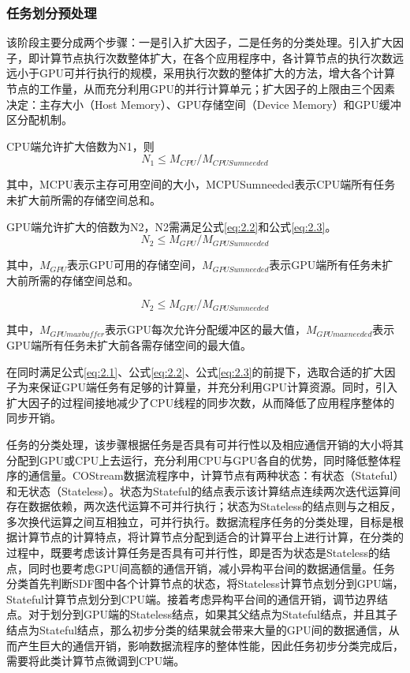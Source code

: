 \subsubsection{任务划分预处理}
该阶段主要分成两个步骤：一是引入扩大因子，二是任务的分类处理。引入扩大因子，即计算节点执行次数整体扩大，在各个应用程序中，各计算节点的执行次数远远小于GPU可并行执行的规模，采用执行次数的整体扩大的方法，增大各个计算节点的工作量，从而充分利用GPU的并行计算单元；扩大因子的上限由三个因素决定：主存大小（Host Memory）、GPU存储空间（Device Memory）和GPU缓冲区分配机制。

CPU端允许扩大倍数为N1，则
\begin{equation}
  N_1 \leq M_{CPU} / M_{CPUSumneeded} \label{eq:2.1}
\end{equation}

其中，MCPU表示主存可用空间的大小，MCPUSumneeded表示CPU端所有任务未扩大前所需的存储空间总和。

GPU端允许扩大的倍数为N2，N2需满足公式\ref{eq:2.2}和公式\ref{eq:2.3}。
\begin{equation}
  N_2 \leq M_{GPU} / M_{GPUSumneeded} \label{eq:2.2}
\end{equation}

其中，$M_{GPU}$表示GPU可用的存储空间，$M_{GPUSumneeded}$表示GPU端所有任务未扩大前所需的存储空间总和。

\begin{equation}
  N_2 \leq M_{GPU} / M_{GPUSumneeded} \label{eq:2.3}
\end{equation}

其中，$M_{GPUmaxbuffer}$表示GPU每次允许分配缓冲区的最大值，$M_{GPUmaxneeded}$表示GPU端所有任务未扩大前各需存储空间的最大值。

在同时满足公式\ref{eq:2.1}、公式\ref{eq:2.2}、公式\ref{eq:2.3}的前提下，选取合适的扩大因子为来保证GPU端任务有足够的计算量，并充分利用GPU计算资源。同时，引入扩大因子的过程间接地减少了CPU线程的同步次数，从而降低了应用程序整体的同步开销。

任务的分类处理，该步骤根据任务是否具有可并行性以及相应通信开销的大小将其分配到GPU或CPU上去运行，充分利用CPU与GPU各自的优势，同时降低整体程序的通信量。COStream数据流程序中，计算节点有两种状态：有状态（Stateful）和无状态（Stateless）。状态为Stateful的结点表示该计算结点连续两次迭代运算间存在数据依赖，两次迭代运算不可并行执行；状态为Stateless的结点则与之相反，多次换代运算之间互相独立，可并行执行。数据流程序任务的分类处理，目标是根据计算节点的计算特点，将计算节点分配到适合的计算平台上进行计算，在分类的过程中，既要考虑该计算任务是否具有可并行性，即是否为状态是Stateless的结点，同时也要考虑GPU间高额的通信开销，减小异构平台间的数据通信量。任务分类首先判断SDF图中各个计算节点的状态，将Stateless计算节点划分到GPU端，Stateful计算节点划分到CPU端。接着考虑异构平台间的通信开销，调节边界结点。对于划分到GPU端的Stateless结点，如果其父结点为Stateful结点，并且其子结点为Stateful结点，那么初步分类的结果就会带来大量的GPU间的数据通信，从而产生巨大的通信开销，影响数据流程序的整体性能，因此任务初步分类完成后，需要将此类计算节点微调到CPU端。


